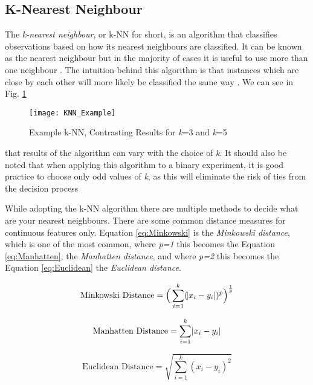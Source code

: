 \subsection{K-Nearest Neighbour} \label{kNN}
The \textit{k-nearest neighbour}, or {k-NN} for short, is an algorithm that classifies observations based on how its nearest neighbours are classified. It can be known as the nearest neighbour but in the majority of cases it is useful to use more than one neighbour \citep{henley_k-nearest-neighbour_1996}. The intuition behind this algorithm is that instances which are close by each other will more likely be classified the same way \citep{cover_nearest_1967}. We can see in Fig. \ref{fig:KNN_Example}\\ %


\begin{figure}[H]
	\texttt{[image: KNN\_Example]}
	\caption{Example k-NN, Contrasting Results for \textit{k}=3 and \textit{k}=5 }
	\label{fig:KNN_Example}
\end{figure}

that results of the algorithm can vary with the choice of \textit{k}. It should also be noted that when applying this algorithm to a binary experiment, it is good practice to choose only odd values of \textit{k}, as this will eliminate the risk of ties from the decision process \citep{keller_fuzzy_1985} 

While adopting the k-NN algorithm there are multiple methods to decide what are your nearest neighbours. There are some common distance measures for continuous features only. Equation \ref{eq:Minkowski} is the \textit{Minkowski distance}, which is one of the most common, where \textit{p=1} this becomes the Equation \ref{eq:Manhatten}, the \textit{Manhatten distance}, and where \textit{p=2} this becomes the Equation \ref{eq:Euclidean} the \textit{Euclidean distance}.

\begin{equation} \label{eq:Minkowski}
	\text{Minkowski Distance}   = \Big(\sum_{i=1}^k (\abs{x_i-y_i})^p\Big)^\frac{1}{p}
\end{equation}

\begin{equation} \label{eq:Manhatten}
	\text{Manhatten Distance}   = \sum_{i=1}^k \abs{x_i-y_i}
\end{equation}

\begin{equation} \label{eq:Euclidean}
	\text{Euclidean Distance}   = \sqrt{\sum_{i=1}^k (x_i-y_i)^2}
\end{equation}

